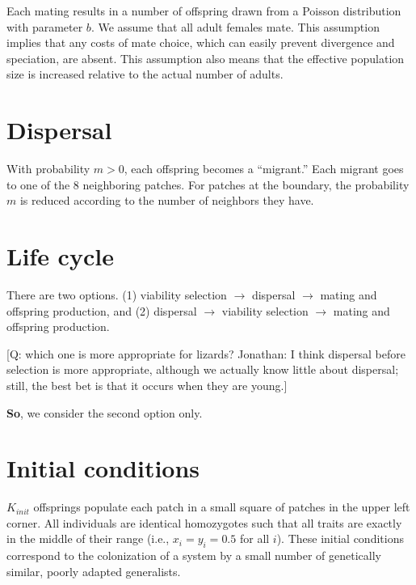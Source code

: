 \documentclass{article}
\begin{document}
Each mating results in a number of offspring drawn from a Poisson distribution with parameter $b$.
We assume that all adult females mate. This assumption implies that any costs of mate choice,
which can easily prevent divergence and speciation, are absent.
This assumption also means that the effective population size is increased relative to the actual
number of adults. 


\section{Dispersal}

With probability $m>0$, each offspring becomes a ``migrant.''
Each migrant goes to one of the 8 neighboring patches.
For patches at the boundary, the probability $m$ is reduced according to the number of neighbors they have.


\section{Life cycle}

There are two options. (1) viability selection $\rightarrow$ dispersal
$\rightarrow$ mating and offspring production, and (2) dispersal
$\rightarrow$ viability selection $\rightarrow$ mating and offspring production.

{\footnotesize [Q: which one is more appropriate for lizards?
Jonathan: I think dispersal before selection is more appropriate,
although we actually know little about dispersal;
still, the best bet is that it occurs when they are young.]}

{\bf So}, we consider the second option only.


\section{Initial conditions}

$K_{init}$ offsprings populate each patch in a small square of patches in the upper left corner.
All individuals are identical homozygotes such that all traits are exactly in the middle of their range (i.e., $x_i=y_i=0.5$ for all $i$).
These initial conditions correspond to the colonization of a system by a small number of genetically similar, poorly adapted generalists.
\end{document}
